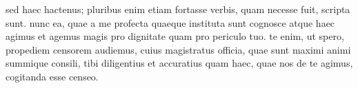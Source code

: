  sed haec hactenus; pluribus enim etiam fortasse verbis, quam necesse fuit, scripta sunt. nunc ea, quae a me profecta quaeque instituta sunt cognosce atque haec agimus et agemus magis pro dignitate quam pro periculo tuo. te enim, ut spero, propediem censorem audiemus, cuius magistratus officia, quae sunt maximi animi summique consili, tibi diligentius et accuratius quam haec, quae nos de te agimus, cogitanda esse censeo.
